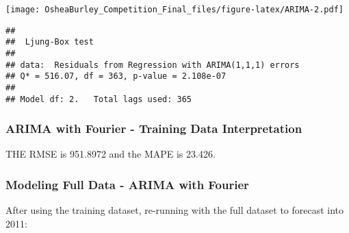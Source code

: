 \documentclass[
]{article}
\newenvironment{Shaded}{\begin{snugshade}}{\end{snugshade}}
\newcommand{\CommentTok}[1]{\textcolor[rgb]{0.56,0.35,0.01}{\textit{#1}}}
\newcommand{\FunctionTok}[1]{\textcolor[rgb]{0.00,0.00,0.00}{#1}}
\newcommand{\NormalTok}[1]{#1}
\newcommand{\OtherTok}[1]{\textcolor[rgb]{0.56,0.35,0.01}{#1}}
\newcommand{\SpecialCharTok}[1]{\textcolor[rgb]{0.00,0.00,0.00}{#1}}
\begin{document}
\texttt{[image: OsheaBurley\_Competition\_Final\_files/figure-latex/ARIMA-2.pdf]}

\begin{verbatim}
## 
##  Ljung-Box test
## 
## data:  Residuals from Regression with ARIMA(1,1,1) errors
## Q* = 516.07, df = 363, p-value = 2.108e-07
## 
## Model df: 2.   Total lags used: 365
\end{verbatim}

\begin{Shaded}
\end{Shaded}

\hypertarget{arima-with-fourier---training-data-interpretation}{%
\subsubsection{ARIMA with Fourier - Training Data
Interpretation}\label{arima-with-fourier---training-data-interpretation}}

THE RMSE is 951.8972 and the MAPE is 23.426.

\hypertarget{modeling-full-data---arima-with-fourier}{%
\subsubsection{Modeling Full Data - ARIMA with
Fourier}\label{modeling-full-data---arima-with-fourier}}

After using the training dataset, re-running with the full dataset to
forecast into 2011:
\end{document}
